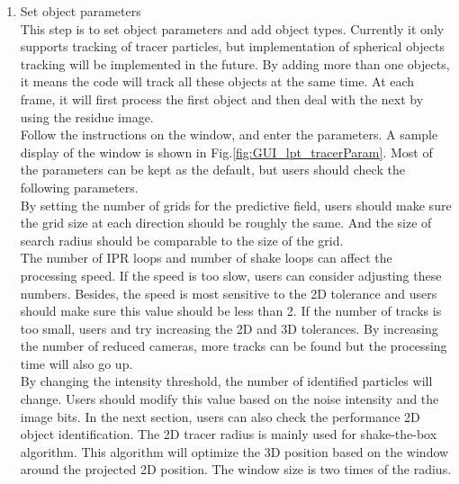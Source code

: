 \documentclass[a4paper,fleqn]{article}
\begin{document}
\begin{enumerate}
\begin{enumerate}
            \item Set object parameters\\
            This step is to set object parameters and add object types. Currently it only supports tracking of tracer particles, but implementation of spherical objects tracking will be implemented in the future. By adding more than one objects, it means the code will track all these objects at the same time. At each frame, it will first process the first object and then deal with the next by using the residue image. \\
            
            Follow the instructions on the window, and enter the parameters. A sample display of the window is shown in Fig.\ref{fig:GUI_lpt_tracerParam}. 
            Most of the parameters can be kept as the default, but users should check the following parameters. \\
            
            By setting the number of grids for the predictive field, users should make sure the grid size at each direction should be roughly the same. And the size of search radius should be comparable to the size of the grid. \\

            The number of IPR loops and number of shake loops can affect the processing speed. If the speed is too slow, users can consider adjusting these numbers. Besides, the speed is most sensitive to the 2D tolerance and users should make sure this value should be less than 2. If the number of tracks is too small, users and try increasing the 2D and 3D tolerances. By increasing the number of reduced cameras, more tracks can be found but the processing time will also go up.  \\

            By changing the intensity threshold, the number of identified particles will change. Users should modify this value based on the noise intensity and the image bits. In the next section, users can also check the performance 2D object identification. The 2D tracer radius is mainly used for shake-the-box algorithm. This algorithm will optimize the 3D position based on the window around the projected 2D position. The window size is two times of the radius.


\end{enumerate}
\end{enumerate}
\end{document}

